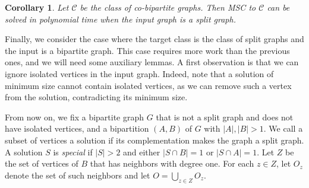 \documentclass[11pt]{article}
\newtheorem{corollary}[theorem]{Corollary}
\theoremstyle{definition}
\begin{document}
\begin{corollary}
\label{cor:split-co-bipartite}
Let $\mathcal{C}$ be the class of co-bipartite graphs.
Then MSC to $\mathcal{C}$ can be solved in polynomial time
when the input graph is a split graph.
\end{corollary}


Finally, we consider the case where the target class is the class of split graphs and the input is a bipartite graph.  
This case requires more work than the previous ones, and we will need some auxiliary lemmas.
A first observation is that we can ignore isolated vertices in the input graph. Indeed, note that a solution of minimum size cannot contain isolated vertices, as we can remove such a vertex from the solution, contradicting its minimum size. 

From now on, we fix a bipartite graph $G$ that is not a split graph and does not have isolated vertices, and a bipartition
$(A,B)$ of $G$ with $|A|,|B|>1$.
We call a subset of vertices a solution if its complementation makes the graph a split graph.
A solution $S$ is \textit{special} if $|S| > 2$ and either $|S \cap B| = 1$ or $|S \cap A| = 1$.
Let $Z$ be the set of vertices of $B$ that has neighbors with degree one. For each $z \in Z$, let $O_z$ denote the set of such neighbors and let $O = \bigcup_{z\in Z}O_z$.
\end{document}
